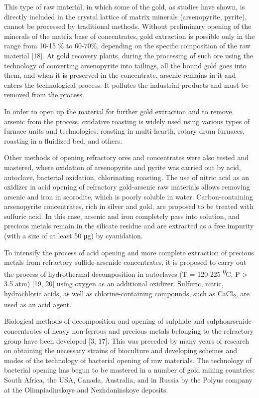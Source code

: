 This type of raw material, in which some of the gold, as studies have
shown, is directly included in the crystal lattice of matrix minerals
(arsenopyrite, pyrite), cannot be processed by traditional methods.
Without preliminary opening of the minerals of the matrix base of
concentrates, gold extraction is possible only in the range from 10-15
\% to 60-70\%, depending on the specific composition of the raw material
{[}18{]}. At gold recovery plants, during the processing of such ore
using the technology of converting arsenopyrite into tailings, all the
bound gold goes into them, and when it is preserved in the concentrate,
arsenic remains in it and enters the technological process. It pollutes
the industrial products and must be removed from the process.

In order to open up the material for further gold extraction and to
remove arsenic from the process, oxidative roasting is widely used using
various types of furnace units and technologies: roasting in
multi-hearth, rotary drum furnaces, roasting in a fluidized bed, and
others.

Other methods of opening refractory ores and concentrates were also
tested and mastered, where oxidation of arsenopyrite and pyrite was
carried out by acid, autoclave, bacterial oxidation, chlorinating
roasting. The use of nitric acid as an oxidizer in acid opening of
refractory gold-arsenic raw materials allows removing arsenic and iron
in scorodite, which is poorly soluble in water. Carbon-containing
arsenopyrite concentrates, rich in silver and gold, are proposed to be
treated with sulfuric acid. In this case, arsenic and iron completely
pass into solution, and precious metals remain in the silicate residue
and are extracted as a free impurity (with a size of at least 50 μg) by
cyanidation.

To intensify the process of acid opening and more complete extraction of
precious metals from refractory sulfide-arsenide concentrates, it is
proposed to carry out the process of hydrothermal decomposition in
autoclaves (T = 120-225 \textsuperscript{0}C, P \textgreater{} 3.5 atm)
{[}19, 20{]} using oxygen as an additional oxidizer. Sulfuric, nitric,
hydrochloric acids, as well as chlorine-containing compounds, such as
CaCl\textsubscript{2}, are used as an acid agent.

Biological methods of decomposition and opening of sulphide and
sulphoarsenide concentrates of heavy non-ferrous and precious metals
belonging to the refractory group have been developed {[}3, 17{]}. This
was preceded by many years of research on obtaining the necessary
strains of bioculture and developing schemes and modes of the technology
of bacterial opening of raw materials. The technology of bacterial
opening has begun to be mastered in a number of gold mining countries:
South Africa, the USA, Canada, Australia, and in Russia by the Polyus
company at the Olimpiadinskoye and Nezhdaninskoye deposits.

